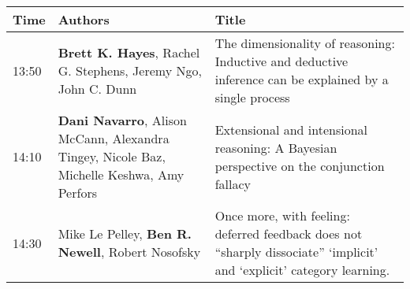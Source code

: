 \documentclass[]{article}
\begin{document}
\begin{longtable}[]{@{}lll@{}}
\toprule
\begin{minipage}[b]{0.03\columnwidth}\raggedright\strut
Time\strut
\end{minipage} & \begin{minipage}[b]{0.39\columnwidth}\raggedright\strut
Authors\strut
\end{minipage} & \begin{minipage}[b]{0.50\columnwidth}\raggedright\strut
Title\strut
\end{minipage}\tabularnewline
\midrule
\endhead
\begin{minipage}[t]{0.03\columnwidth}\raggedright\strut
13:50\strut
\end{minipage} & \begin{minipage}[t]{0.39\columnwidth}\raggedright\strut
\textbf{Brett K. Hayes}, Rachel G. Stephens, Jeremy Ngo, John C.
Dunn\strut
\end{minipage} & \begin{minipage}[t]{0.50\columnwidth}\raggedright\strut
The dimensionality of reasoning: Inductive and deductive inference can
be explained by a single process\strut
\end{minipage}\tabularnewline
\begin{minipage}[t]{0.03\columnwidth}\raggedright\strut
14:10\strut
\end{minipage} & \begin{minipage}[t]{0.39\columnwidth}\raggedright\strut
\textbf{Dani Navarro}, Alison McCann, Alexandra Tingey, Nicole Baz,
Michelle Keshwa, Amy Perfors\strut
\end{minipage} & \begin{minipage}[t]{0.50\columnwidth}\raggedright\strut
Extensional and intensional reasoning: A Bayesian perspective on the
conjunction fallacy\strut
\end{minipage}\tabularnewline
\begin{minipage}[t]{0.03\columnwidth}\raggedright\strut
14:30\strut
\end{minipage} & \begin{minipage}[t]{0.39\columnwidth}\raggedright\strut
Mike Le Pelley, \textbf{Ben R. Newell}, Robert Nosofsky\strut
\end{minipage} & \begin{minipage}[t]{0.50\columnwidth}\raggedright\strut
Once more, with feeling: deferred feedback does not ``sharply
dissociate'' `implicit' and `explicit' category learning.\strut
\end{minipage}\tabularnewline

\end{longtable}
\end{document}
